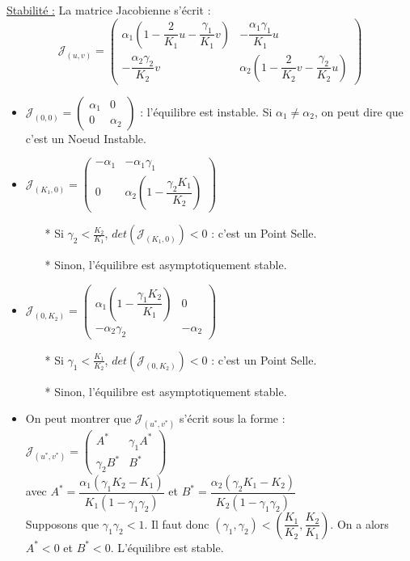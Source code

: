 \documentclass[a4paper,11pt]{article}
\begin{document}
\noindent \underline{Stabilité :}
La matrice Jacobienne s'écrit : $$\mathcal{J}_{(u,v)}=\begin{pmatrix} \alpha_1\left(1-\dfrac{2}{K_1}u-\dfrac{\gamma_1}{K_1}v\right) & -\dfrac{\alpha_1\gamma_1}{K_1}u \\ -\dfrac{\alpha_2\gamma_2}{K_2}v & \alpha_2\left(1- \dfrac{2}{K_2}v-\dfrac{\gamma_2}{K_2}u\right)\end{pmatrix}$$
\begin{itemize}[label=$\bullet$]
\item $\mathcal{J}_{(0,0)} = \begin{pmatrix} \alpha_1 & 0 \\ 0 & \alpha_2 
\end{pmatrix}$
 : l'équilibre est instable. Si $\alpha_1 \neq \alpha_2$, on peut dire que c'est un Noeud Instable.
 
 \item $\mathcal{J}_{(K_1,0)} = \begin{pmatrix} -\alpha_1 & -\alpha_1\gamma_1 \\ 0 & \alpha_2\left(1- \dfrac{\gamma_2 K_1}{K_2}\right)
\end{pmatrix} $\\
\begin{itemize}
  \item[*] Si $\gamma_2 < \frac{K_2}{K_1}$, $det(\mathcal{J}_{(K_1,0)}) < 0$ : c'est un Point Selle.
  \item[*] Sinon, l'équilibre est asymptotiquement stable.\\
  \end{itemize}
  
\item $\mathcal{J}_{(0,K_2)} = \begin{pmatrix} \alpha_1\left(1-\dfrac{\gamma_1 K_2}{K_1}\right) & 0 \\ -\alpha_2\gamma_2 & -\alpha_2 \end{pmatrix}$\\
  \begin{itemize}
  \item[*] Si $\gamma_1 < \frac{K_1}{K_2}$, $det(\mathcal{J}_{(0,K_2)}) < 0$ : c'est un Point Selle.
  \item[*] Sinon, l'équilibre est asymptotiquement stable.
  \end{itemize} 
  
\item On peut montrer que $\mathcal{J}_{(u^*,v^*)}$ s'écrit sous la forme : $\mathcal{J}_{(u^*,v^*)} = \begin{pmatrix}
A^* & \gamma_1A^* \\ \gamma_2B^* & B^*
\end{pmatrix}$ \\
avec $A^* = \dfrac{\alpha_1(\gamma_1K_2-K_1)}{K_1(1-\gamma_1\gamma_2)}$ et $B^* = \dfrac{\alpha_2(\gamma_2K_1-K_2)}{K_2(1-\gamma_1\gamma_2)}$\\

Supposons que $\gamma_1\gamma_2 < 1$. Il faut donc $(\gamma_1,\gamma_2) < \left(\dfrac{K_1}{K_2},\dfrac{K_2}{K_1}\right)$.
On a alors $A^* < 0$ et $B^* < 0$. L'équilibre est stable.\\

\end{itemize}
\end{document}
